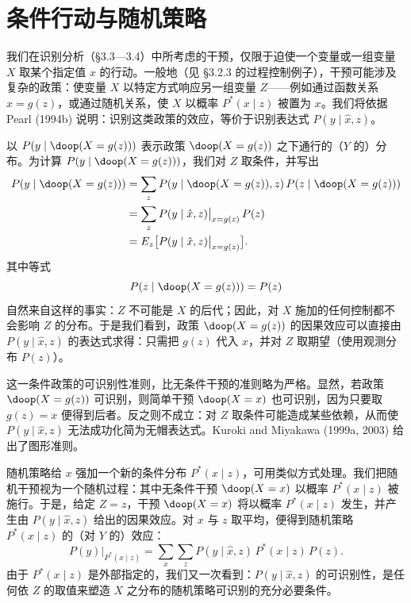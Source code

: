 \section{条件行动与随机策略}

我们在识别分析（\S 3.3—3.4）中所考虑的干预，仅限于迫使一个变量或一组变量 $X$ 取某个指定值 $x$ 的行动。一般地（见 \S 3.2.3 的过程控制例子），干预可能涉及复杂的政策：使变量 $X$ 以特定方式响应另一组变量 $Z$——例如通过函数关系 $x=g(z)$，或通过随机关系，使 $X$ 以概率 $P^*(x\mid z)$ 被置为 $x$。我们将依据 Pearl (1994b) 说明：识别这类政策的效应，等价于识别表达式 $P(y\mid\hat{x},z)$。

以 $P(y\mid\doop(X=g(z)))$ 表示政策 $\doop(X=g(z))$ 之下通行的（$Y$ 的）分布。为计算 $P(y\mid\doop(X=g(z)))$，我们对 $Z$ 取条件，并写出
\begin{equation*}
\begin{aligned}
P(y\mid\doop(X=g(z))) &= \sum_z P(y\mid\doop(X=g(z)),z)\,P(z\mid\doop(X=g(z)))\\
&= \sum_z P(y\mid\hat{x},z)\big|_{x=g(z)}\,P(z)\\
&= E_z\big[P(y\mid\hat{x},z)\big|_{x=g(z)}\big].
\end{aligned}
\end{equation*}
其中等式
\[
P(z\mid\doop(X=g(z))) = P(z)
\]
自然来自这样的事实：$Z$ 不可能是 $X$ 的后代；因此，对 $X$ 施加的任何控制都不会影响 $Z$ 的分布。于是我们看到，政策 $\doop(X=g(z))$ 的因果效应可以直接由 $P(y\mid\hat{x},z)$ 的表达式求得：只需把 $g(z)$ 代入 $x$，并对 $Z$ 取期望（使用观测分布 $P(z)$）。

这一条件政策的可识别性准则，比无条件干预的准则略为严格。显然，若政策 $\doop(X=g(z))$ 可识别，则简单干预 $\doop(X=x)$ 也可识别，因为只要取 $g(z)=x$ 便得到后者。反之则不成立：对 $Z$ 取条件可能造成某些依赖，从而使 $P(y\mid\hat{x},z)$ 无法成功化简为无帽表达式。Kuroki and Miyakawa (1999a, 2003) 给出了图形准则。

随机策略给 $x$ 强加一个新的条件分布 $P^*(x\mid z)$，可用类似方式处理。我们把随机干预视为一个随机过程：其中无条件干预 $\doop(X=x)$ 以概率 $P^*(x\mid z)$ 被施行。于是，给定 $Z=z$，干预 $\doop(X=x)$ 将以概率 $P^*(x\mid z)$ 发生，并产生由 $P(y\mid\hat{x},z)$ 给出的因果效应。对 $x$ 与 $z$ 取平均，便得到随机策略 $P^*(x\mid z)$ 的（对 $Y$ 的）效应：
\begin{equation*}
P(y)\big|_{P^*(x\mid z)} = \sum_x\sum_z P(y\mid\hat{x},z)\,P^*(x\mid z)\,P(z).
\end{equation*}
由于 $P^*(x\mid z)$ 是外部指定的，我们又一次看到：$P(y\mid\hat{x},z)$ 的可识别性，是任何依 $Z$ 的取值来塑造 $X$ 之分布的随机策略可识别的充分必要条件。

